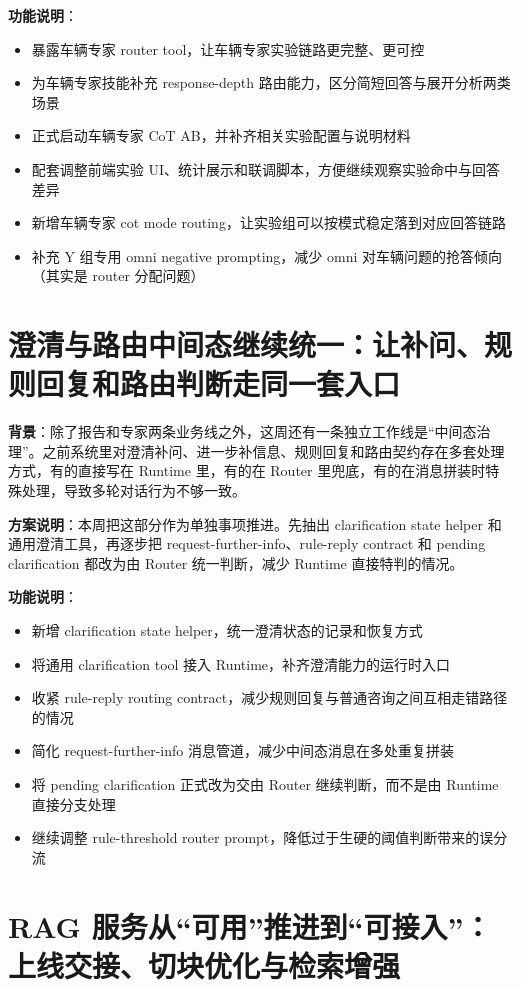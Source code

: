 \documentclass[UTF8]{ctexart}
\begin{document}
\textbf{功能说明}：
\begin{itemize}
\item 暴露车辆专家 router tool，让车辆专家实验链路更完整、更可控
\item 为车辆专家技能补充 response-depth 路由能力，区分简短回答与展开分析两类场景
\item 正式启动车辆专家 CoT AB，并补齐相关实验配置与说明材料
\item 配套调整前端实验 UI、统计展示和联调脚本，方便继续观察实验命中与回答差异
\item 新增车辆专家 cot mode routing，让实验组可以按模式稳定落到对应回答链路
\item 补充 Y 组专用 omni negative prompting，减少 omni 对车辆问题的抢答倾向（其实是 router 分配问题）
\end{itemize}

\section{澄清与路由中间态继续统一：让补问、规则回复和路由判断走同一套入口}

\textbf{背景}：除了报告和专家两条业务线之外，这周还有一条独立工作线是“中间态治理”。之前系统里对澄清补问、进一步补信息、规则回复和路由契约存在多套处理方式，有的直接写在 Runtime 里，有的在 Router 里兜底，有的在消息拼装时特殊处理，导致多轮对话行为不够一致。

\textbf{方案说明}：本周把这部分作为单独事项推进。先抽出 clarification state helper 和通用澄清工具，再逐步把 request-further-info、rule-reply contract 和 pending clarification 都改为由 Router 统一判断，减少 Runtime 直接特判的情况。

\textbf{功能说明}：
\begin{itemize}
\item 新增 clarification state helper，统一澄清状态的记录和恢复方式
\item 将通用 clarification tool 接入 Runtime，补齐澄清能力的运行时入口
\item 收紧 rule-reply routing contract，减少规则回复与普通咨询之间互相走错路径的情况
\item 简化 request-further-info 消息管道，减少中间态消息在多处重复拼装
\item 将 pending clarification 正式改为交由 Router 继续判断，而不是由 Runtime 直接分支处理
\item 继续调整 rule-threshold router prompt，降低过于生硬的阈值判断带来的误分流
\end{itemize}

\section{RAG 服务从“可用”推进到“可接入”：上线交接、切块优化与检索增强}
\end{document}
